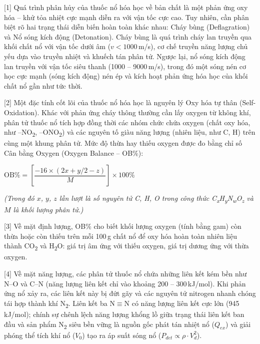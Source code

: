 \documentclass[12pt,a4paper,twoside]{article}
\newenvironment{readingpassage}[1][]{%
    \begin{tcolorbox}[enhanced, colback=grayLight, colframe=secondaryBlue,
        coltitle=textDark, fonttitle=\bfseries, title={#1},
        rounded corners, arc=3mm, boxrule=1pt,
        left=15pt, right=15pt, top=10pt, bottom=10pt,
        breakable, before skip=10pt, after skip=10pt, drop fuzzy shadow]
    \setstretch{1.3}
}{\end{tcolorbox}}
\begin{document}
\begin{readingpassage}[]

[1] Quá trình phân hủy của thuốc nổ hóa học về bản chất là một phản ứng oxy hóa -- khử tỏa nhiệt cực mạnh diễn ra với vận tốc cực cao. Tuy nhiên, cần phân biệt rõ hai trạng thái diễn biến hoàn toàn khác nhau: Cháy bùng (Deflagration) và Nổ sóng kích động (Detonation). Cháy bùng là quá trình cháy lan truyền qua khối chất nổ với vận tốc dưới âm ($v < 1000$\,m/s), cơ chế truyền năng lượng chủ yếu dựa vào truyền nhiệt và khuếch tán phân tử. Ngược lại, nổ sóng kích động lan truyền với vận tốc siêu thanh (1000 -- 9000\,m/s), trong đó một sóng nén cơ học cực mạnh (sóng kích động) nén ép và kích hoạt phản ứng hóa học của khối chất nổ gần như tức thời.

[2] Một đặc tính cốt lõi của thuốc nổ hóa học là nguyên lý Oxy hóa tự thân (Self-Oxidation). Khác với phản ứng cháy thông thường cần lấy oxygen từ không khí, phân tử thuốc nổ tích hợp đồng thời các nhóm chức chứa oxygen (chất oxy hóa, như --NO\textsubscript{2}, --ONO\textsubscript{2}) và các nguyên tố giàu năng lượng (nhiên liệu, như C, H) trên cùng một khung phân tử. Mức độ thừa hay thiếu oxygen được đo bằng chỉ số Cân bằng Oxygen (Oxygen Balance -- OB\%):

\vspace{4pt}
\begin{center}
$\text{OB\%} = \left[\dfrac{-16 \times (2x + y/2 - z)}{M}\right] \times 100\%$
\end{center}
\vspace{2pt}

\textit{(Trong đó $x$, $y$, $z$ lần lượt là số nguyên tử C, H, O trong công thức C\textsubscript{x}H\textsubscript{y}N\textsubscript{w}O\textsubscript{z} và $M$ là khối lượng phân tử.)}

[3] Về mặt định lượng, OB\% cho biết khối lượng oxygen (tính bằng gam) còn thừa hoặc còn thiếu trên mỗi 100\,g chất nổ để oxy hóa hoàn toàn nhiên liệu thành CO\textsubscript{2} và H\textsubscript{2}O: giá trị âm ứng với thiếu oxygen, giá trị dương ứng với thừa oxygen.

[4] Về mặt năng lượng, các phân tử thuốc nổ chứa những liên kết kém bền như N--O và C--N (năng lượng liên kết chỉ vào khoảng 200 -- 300\,kJ/mol). Khi phản ứng nổ xảy ra, các liên kết này bị đứt gãy và các nguyên tử nitrogen nhanh chóng tái hợp thành khí N\textsubscript{2}. Liên kết ba N$\equiv$N có năng lượng liên kết cực lớn (945\,kJ/mol); chính sự chênh lệch năng lượng khổng lồ giữa trạng thái liên kết ban đầu và sản phẩm N\textsubscript{2} siêu bền vững là nguồn gốc phát tán nhiệt nổ ($Q_{ex}$) và giải phóng thể tích khí nổ ($V_0$) tạo ra áp suất sóng nổ ($P_{det} \propto \rho \cdot V_d^2$).


\end{readingpassage}
\end{document}

